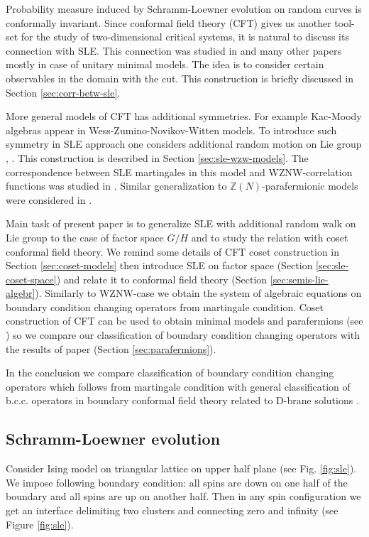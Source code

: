 \documentclass[a4paper]{jpconf}
\theoremstyle{definition}
\theoremstyle{definition} \newtheorem{Def}{Definition}
\begin{document}
Probability measure induced by Schramm-Loewner evolution on random curves is conformally invariant. Since conformal field theory (CFT) gives us another tool-set for the study of two-dimensional critical systems, it is natural to discuss its connection with SLE.  This connection  was studied in \cite{bauer2004conformal,bauer2004cfts,bauer2003sle,bauer2002sle} and many other papers mostly in case of unitary minimal models.
The idea is to consider certain observables in the domain with the cut. This construction is briefly discussed in Section \ref{sec:corr-betw-sle}. 

More general models of CFT has additional symmetries. For example Kac-Moody algebras  appear in Wess-Zumino-Novikov-Witten models. To introduce such symmetry in SLE approach one considers additional random motion on Lie group \cite{bettelheim2005stochastic}, \cite{Rasmussen:2004xr}. This construction is described in Section \ref{sec:sle-wzw-models}. The correspondence between SLE martingales in this model and WZNW-correlation functions was studied in \cite{alekseev2010sle}. Similar generalization to $\mathbb{Z}(N)$-parafermionic models were considered in \cite{santachiara2008sle,picco2008numerical}. 

Main task of present paper is to generalize SLE with additional random walk on Lie group to the case of factor space $G/H$ and to study the relation with coset conformal field theory. We remind some details of CFT coset construction in Section  \ref{sec:coset-models} then introduce SLE on factor space (Section \ref{sec:sle-coset-space}) and relate it to conformal field theory (Section \ref{sec:semis-lie-algebr}). Similarly to WZNW-case we obtain the system of algebraic equations on boundary condition changing operators from martingale condition. 
Coset construction of CFT can be used to obtain minimal models and parafermions (see \cite{difrancesco1997cft}) so we compare our classification of boundary condition changing operators with the results of paper \cite{santachiara2008sle} (Section \ref{sec:parafermions}). 

In the conclusion we compare classification of boundary condition changing operators which follows from martingale condition with general classification of b.c.c. operators in boundary conformal field theory related to D-brane solutions \cite{fuchs2005geometry,fredenhagen2002d,elitzur2002d,Maldacena:2001ky,felder1999geometry,alekseev1999d}. 

\subsection{Schramm-Loewner evolution}
\label{sec:schr-loewn-evol}
Consider Ising model on triangular lattice on upper half plane (see Fig. \ref{fig:sle}). We impose following boundary condition: all spins are down on one half of the boundary and all spins are up on another half. Then in any spin configuration we get an interface delimiting two clusters and connecting zero and infinity (see Figure \ref{fig:sle}).
\end{document}

